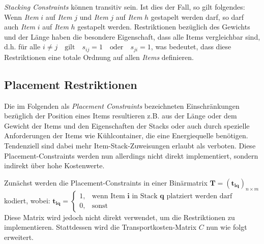 \textit{Stacking Constraints} können transitiv sein. Ist dies der Fall, so gilt folgendes:\newline
Wenn \textit{Item} $i$ auf \textit{Item} $j$ und \textit{Item} $j$ auf \textit{Item} $h$ gestapelt werden darf,
so darf auch \textit{Item} $i$ auf \textit{Item} $h$ gestapelt werden.\newline
Restriktionen bezüglich des Gewichts und der Länge haben die besondere Eigenschaft, dass alle Items vergleichbar sind, d.h. für alle $i \neq j  \quad \text{gilt} \quad s_{ij} = 1 \quad \text{oder} \quad s_{ji} = 1$, was bedeutet, dass diese Restriktionen eine totale Ordnung auf allen \textit{Items} definieren.

\pagebreak

\subsection{Placement Restriktionen}
\label{sec:placement_restrictions}

Die im Folgenden als \textit{Placement Constraints} bezeichneten Einschränkungen bezüglich der Position eines Items resultieren z.B.
aus der Länge oder dem Gewicht der Items und den Eigenschaften der Stacks oder auch durch spezielle Anforderungen der Items wie
Kühlcontainer, die eine Energiequelle benötigen. Tendenziell sind dabei mehr Item-Stack-Zuweisungen erlaubt als verboten.
Diese Placement-Constraints werden nun allerdings nicht direkt implementiert, sondern indirekt über hohe Kostenwerte.\newline

Zunächst werden die Placement-Constraints in einer Binärmatrix $\boldsymbol{T} = (\boldsymbol{t_{iq}})_{n \times m}$ kodiert, wobei:\newline
$
    \boldsymbol{t_{iq}} =
\begin{cases}
    1, & \text{wenn Item $\boldsymbol{i}$ in Stack $\boldsymbol{q}$ platziert werden darf }\\
    0, & \text{sonst}
\end{cases}
$
\\[20pt]

Diese Matrix wird jedoch nicht direkt verwendet, um die Restriktionen zu implementieren. Stattdessen wird
die Transportkosten-Matrix $C$ nun wie folgt erweitert.

